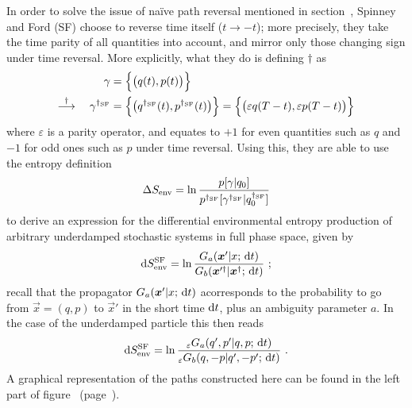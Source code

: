 In order to solve the issue of na\"ive path reversal mentioned in section~, Spinney and Ford (SF) \cite{sf} choose to reverse time itself (\(t\to-t\)); more precisely, they take the time parity of all quantities into account, and mirror only those changing sign under time reversal. More explicitly, what they do is defining \(\dagger\) as 
%
\begin{equation}\begin{split}
	\gamma &= \Bigl\{\bigl(q(t),p(t)\bigr)\Bigr\}
	\\ \overset\dagger\longrightarrow \quad
	\gamma^{\dagger_{\text{SF}}}
		&= \Bigl\{\bigl(q^{\dagger_{\text{SF}}}(t),p^{\dagger_{\text{SF}}}(t)\bigr)\Bigr\}
		= \Bigl\{\bigl(\varepsilon q(T-t),\varepsilon p(T-t)\bigr)\Bigr\}
\end{split}\end{equation}
%
where \(\varepsilon\) is a parity operator, and equates to \(+1\) for even quantities such as \(q\) and \(-1\) for odd ones such as \(p\) under time reversal. Using this, they are able to use the entropy definition
%
\begin{equation}
	\Delta S_\text{env} = \ln\frac{p[\gamma | q_0]}{p^{\dagger_{\text{SF}}}[\gamma^{\dagger_{\text{SF}}} | q_0^{\dagger_{\text{SF}}}]}
\end{equation}
%
to derive an expression for the differential environmental entropy production of arbitrary underdamped stochastic systems in full phase space,  given by
%
\begin{equation}
	\mathrm{d}S_\text{env}^{\text{SF}} = \ln \frac{G_a(\boldsymbol{x}'|x;\,\mathrm{d} t)}{G_b(\boldsymbol{x}'^\dagger|\boldsymbol{x}^\dagger;\,\mathrm{d} t)} ~;
\end{equation}
%
recall that the propagator \(G_a(\boldsymbol{x}'|x;\,\mathrm{d} t)\) acorresponds to the probability to go from \(\vec x = (q,p)\) to \(\vec x'\) in the short time \(\mathrm{d} t\), plus an ambiguity parameter \(a\). In the case of the underdamped particle  this then reads
%
\begin{equation}
	\label{eqn:DSEnv spinney main definition}
	\mathrm{d}S_\text{env}^{\text{SF}} =
		\ln \frac
			{_\varepsilon G_a(q',p'|q,p;\,\mathrm{d} t)}
			{_\varepsilon G_b(q,-p|q',-p';\,\mathrm{d} t)} ~.
\end{equation}
%
A graphical representation of the paths constructed here can be found in the left part of figure~ (page~\pageref{fig:hf sf}).

